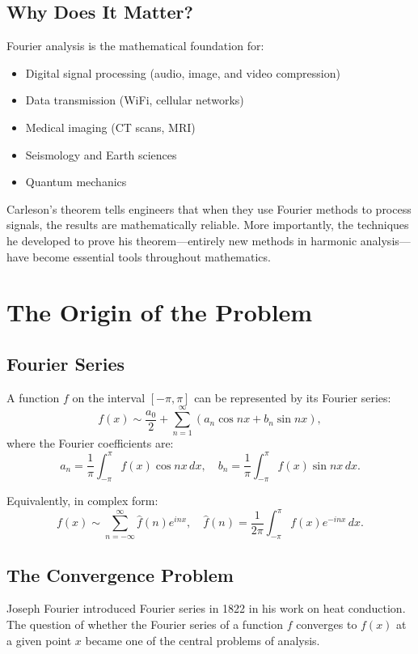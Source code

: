\subsection{Why Does It Matter?}

Fourier analysis is the mathematical foundation for:

\begin{itemize}
\item Digital signal processing (audio, image, and video compression)
\item Data transmission (WiFi, cellular networks)
\item Medical imaging (CT scans, MRI)
\item Seismology and Earth sciences
\item Quantum mechanics
\end{itemize}

Carleson's theorem tells engineers that when they use Fourier methods to process signals, the results are mathematically reliable. More importantly, the techniques he developed to prove his theorem---entirely new methods in harmonic analysis---have become essential tools throughout mathematics.

\section{The Origin of the Problem}

\subsection{Fourier Series}

A function $f$ on the interval $[-\pi, \pi]$ can be represented by its Fourier series:
\[
f(x) \sim \frac{a_0}{2} + \sum_{n=1}^{\infty} (a_n \cos nx + b_n \sin nx),
\]
where the Fourier coefficients are:
\[
a_n = \frac{1}{\pi} \int_{-\pi}^{\pi} f(x) \cos nx \, dx, \quad
b_n = \frac{1}{\pi} \int_{-\pi}^{\pi} f(x) \sin nx \, dx.
\]

Equivalently, in complex form:
\[
f(x) \sim \sum_{n=-\infty}^{\infty} \hat f(n) e^{inx}, \quad
\hat f(n) = \frac{1}{2\pi} \int_{-\pi}^{\pi} f(x) e^{-inx} \, dx.
\]

\subsection{The Convergence Problem}

Joseph Fourier introduced Fourier series in 1822 in his work on heat conduction. The question of whether the Fourier series of a function $f$ converges to $f(x)$ at a given point $x$ became one of the central problems of analysis.

